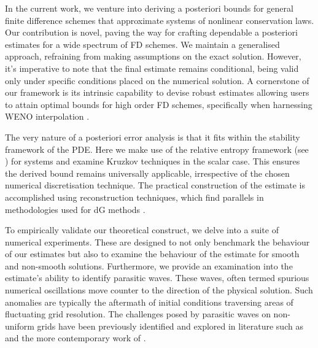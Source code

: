 \documentclass[final]{amsart}
\numberwithin{equation}{section}
\begin{document}
In the current work, we venture into deriving a posteriori bounds for
general finite difference schemes that approximate systems of
nonlinear conservation laws. Our contribution is novel, paving the way
for crafting dependable a posteriori estimates for a wide spectrum of
FD schemes. We maintain a generalised approach, refraining from making
assumptions on the exact solution. However, it's imperative to note
that the final estimate remains conditional, being valid only under
specific conditions placed on the numerical solution. A cornerstone of
our framework is its intrinsic capability to devise robust estimates
allowing users to attain optimal bounds for high order FD schemes,
specifically when harnessing WENO interpolation
\cite{liu2009positivity,janett2019novel}.

The very nature of a posteriori error analysis is that it fits within
the stability framework of the PDE. Here we make use of the relative
entropy framework (see \cite{dafermos2005hyperbolic})  for systems and examine Kruzkov techniques
\cite{bouchut1998kruzkov} in the scalar case. This ensures the derived
bound remains universally applicable, irrespective of the chosen
numerical discretisation technique. The practical construction of the
estimate is accomplished using reconstruction techniques, which find
parallels in methodologies used for dG methods
\cite{makridakis2007space,giesselmann2015posteriori,giesselmann2017posteriori,dedner2019residual}.

To empirically validate our theoretical construct, we delve into a
suite of numerical experiments. These are designed to not only
benchmark the behaviour of our estimates but also to examine the
behaviour of the estimate for smooth and non-smooth
solutions. Furthermore, we provide an examination into the
estimate's ability to identify parasitic waves. These waves, often
termed spurious numerical oscillations move counter to the direction
of the physical solution. Such anomalies are typically the aftermath
of initial conditions traversing areas of fluctuating grid
resolution. The challenges posed by parasitic waves on non-uniform
grids have been previously identified and explored in literature such
as \cite{vichnevetsky1981energy, vichnevetsky1981propagation,
  trefethen1982group} and the more contemporary work of
\cite{long2011numerical}.
\end{document}
